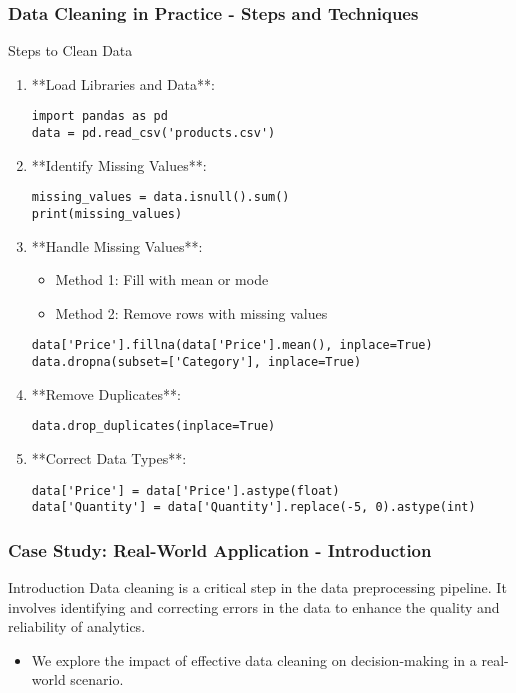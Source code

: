 \documentclass[aspectratio=169]{beamer}
\begin{document}
\begin{frame}[fragile]
    \frametitle{Data Cleaning in Practice - Steps and Techniques}
    \begin{block}{Steps to Clean Data}
        \begin{enumerate}
            \item **Load Libraries and Data**:
            \begin{lstlisting}
import pandas as pd
data = pd.read_csv('products.csv')
            \end{lstlisting}

            \item **Identify Missing Values**:
            \begin{lstlisting}
missing_values = data.isnull().sum()
print(missing_values)
            \end{lstlisting}

            \item **Handle Missing Values**:
            \begin{itemize}
                \item Method 1: Fill with mean or mode
                \item Method 2: Remove rows with missing values
            \end{itemize}
            \begin{lstlisting}
data['Price'].fillna(data['Price'].mean(), inplace=True)
data.dropna(subset=['Category'], inplace=True)
            \end{lstlisting}

            \item **Remove Duplicates**:
            \begin{lstlisting}
data.drop_duplicates(inplace=True)
            \end{lstlisting}

            \item **Correct Data Types**:
            \begin{lstlisting}
data['Price'] = data['Price'].astype(float)
data['Quantity'] = data['Quantity'].replace(-5, 0).astype(int)
            \end{lstlisting}
        \end{enumerate}
    \end{block}
\end{frame}

\begin{frame}[fragile]
    \frametitle{Case Study: Real-World Application - Introduction}
    \begin{block}{Introduction}
        Data cleaning is a critical step in the data preprocessing pipeline. It involves identifying and correcting errors in the data to enhance the quality and reliability of analytics.
    \end{block}
    \begin{itemize}
        \item We explore the impact of effective data cleaning on decision-making in a real-world scenario.
    \end{itemize}
\end{frame}
\end{document}
